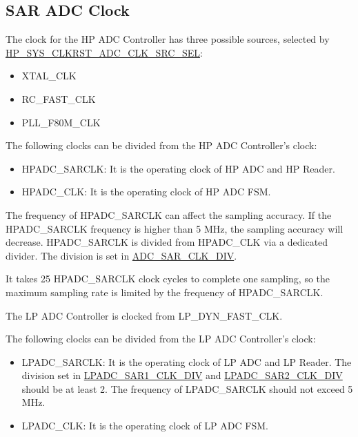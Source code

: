 \documentclass[main\_\_EN.tex]{subfiles}
\begin{document}
\subsection{SAR ADC Clock}

The clock for the HP ADC Controller has three possible sources, selected by \hyperref[fielddesc:HPSYSCLKRSTADCCLKSRCSEL]{HP\_SYS\_CLKRST\_ADC\_CLK\_SRC\_SEL}:

    \begin{itemize}
       \item XTAL\_CLK
       \item RC\_FAST\_CLK
       \item PLL\_F80M\_CLK
    \end{itemize}

The following clocks can be divided from the HP ADC Controller's clock:

\begin{itemize}
    \item HPADC\_SARCLK: It is the operating clock of HP ADC and HP Reader.
    \item HPADC\_CLK: It is the operating clock of HP ADC FSM.
\end{itemize}

The frequency of HPADC\_SARCLK can affect the sampling accuracy. If the HPADC\_SARCLK frequency is higher than 5 MHz, the sampling accuracy will decrease. HPADC\_SARCLK is divided from HPADC\_CLK via a dedicated divider. The division is set in \hyperref[fielddesc:ADCSARCLKDIV]{ADC\_SAR\_CLK\_DIV}.

It takes 25 HPADC\_SARCLK clock cycles to complete one sampling, so the maximum sampling rate is limited by the frequency of HPADC\_SARCLK.

The LP ADC Controller is clocked from LP\_DYN\_FAST\_CLK.

The following clocks can be divided from the LP ADC Controller's clock:

\begin{itemize}
    \item LPADC\_SARCLK: It is the operating clock of LP ADC and LP Reader. The division set in \hyperref[fielddesc:LPADCSAR1CLKDIV]{LPADC\_SAR1\_CLK\_DIV} and \hyperref[fielddesc:LPADCSAR2CLKDIV]{LPADC\_SAR2\_CLK\_DIV} should be at least 2. The frequency of LPADC\_SARCLK should not exceed 5 MHz.
    \item LPADC\_CLK: It is the operating clock of LP ADC FSM.
\end{itemize}
\end{document}
